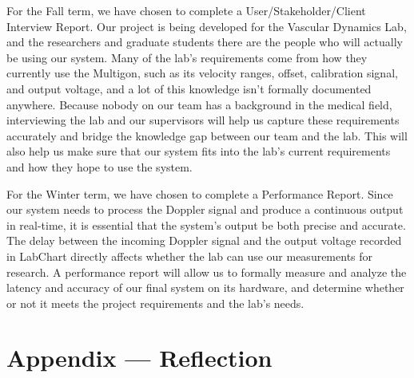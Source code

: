 \documentclass{article}
\begin{document}


For the Fall term, we have chosen to complete a User/Stakeholder/Client
Interview Report. Our project is being developed for the Vascular Dynamics Lab,
and the researchers and graduate students there are the people who will
actually be using our system. Many of the lab's requirements come from how they
currently use the Multigon, such as its velocity ranges, offset, calibration
signal, and output voltage, and a lot of this knowledge isn't formally
documented anywhere. Because nobody on our team has a background in the medical
field, interviewing the lab and our supervisors will help us capture these
requirements accurately and bridge the knowledge gap between our team and the
lab. This will also help us make sure that our system fits into the lab's
current requirements and how they hope to use the system.


For the Winter term, we have chosen to complete a Performance Report. Since our
system needs to process the Doppler signal and produce a continuous output in
real-time, it is essential that the system's output be both precise and
accurate. The delay between the incoming Doppler signal and the output voltage
recorded in LabChart directly affects whether the lab can use our measurements
for research. A performance report will allow us to formally measure and
analyze the latency and accuracy of our final system on its hardware, and
determine whether or not it meets the project requirements and the lab's needs.

\newpage{}

\section*{Appendix --- Reflection}

\end{document}
